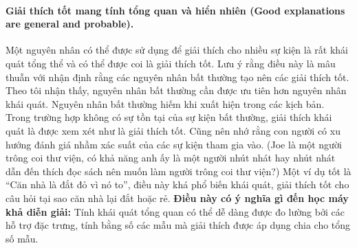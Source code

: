 \paragraph{Giải thích tốt mang tính tổng quan và hiển nhiên (Good explanations are general and probable).} Một nguyên nhân có thể được sử dụng để giải thích cho nhiều sự kiện là rất khái quát tổng thể và có thể được coi là giải thích tốt. Lưu ý rằng điều này là mâu thuẫn với nhận định rằng các nguyên nhân bất thường tạo nên các giải thích tốt. Theo tôi nhận thấy, nguyên nhân bất thường cần được ưu tiên hơn nguyên nhân khái quát. Nguyên nhân bất thường hiếm khi xuất hiện trong các kịch bản. Trong trường hợp không có sự tồn tại của sự kiện bất thường, giải thích khái quát là được xem xét như là giải thích tốt. Cũng nên nhớ rằng con người có xu hướng đánh giá nhầm xác suất của các sự kiện tham gia vào. (Joe là một người trông coi thư viện, có khả năng anh ấy là một người nhút nhát hay nhút nhát dẫn đến thích đọc sách nên muốn làm người trông coi thư viện?) Một ví dụ tốt là ``Căn nhà là đắt đỏ vì nó to'', điều này khá phổ biến khái quát, giải thích tốt cho câu hỏi tại sao căn nhà lại đắt hoặc rẻ.
\textbf{Điều này có ý nghĩa gì đến học máy khả diễn giải:} Tính khái quát tổng quan có thể dễ dàng được đo lường bởi các hỗ trợ đặc trưng, tính bằng số các mẫu mà  giải thích được áp dụng chia cho tổng số mẫu.

\clearpage